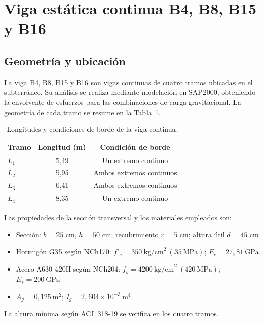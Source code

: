 \section{Viga estática continua B4, B8, B15 y B16}
\label{sec:viga-b16}
 
\subsection{Geometría y ubicación}
 
La viga B4, B8, B15 y B16 son vigas continuas de cuatro tramos ubicadas en el subterráneo. Su análisis se realiza mediante modelación en SAP2000, obteniendo la envolvente de esfuerzos para las combinaciones de carga gravitacional. La geometría de cada tramo se resume en la Tabla~\ref{tab:viga-tramos}.
 
\begin{table}[h!]
\centering
\caption{Longitudes y condiciones de borde de la viga continua.}
\label{tab:viga-tramos}
\begin{tabular}{lcc}
\toprule
Tramo & Longitud (m) & Condición de borde \\
\midrule
$L_1$ & 5{,}49 & Un extremo continuo \\
$L_2$ & 5{,}95 & Ambos extremos continuos \\
$L_3$ & 6{,}41 & Ambos extremos continuos \\
$L_4$ & 8{,}35 & Un extremo continuo \\
\bottomrule
\end{tabular}
\end{table}
 
\noindent Las propiedades de la sección transversal y los materiales empleados son:
 
\begin{itemize}
    \item Sección: $b = 25$ cm, $h = 50$ cm; recubrimiento $r = 5$ cm; altura útil $d = 45$ cm
    \item Hormigón G35 según NCh170: $f'_c = 350\ \text{kg/cm}^2\ (35\ \text{MPa})$; $E_c = 27{,}81\ \text{GPa}$
    \item Acero A630-420H según NCh204: $f_y = 4200\ \text{kg/cm}^2\ (420\ \text{MPa})$; $E_s = 200\ \text{GPa}$
    \item $A_g = 0{,}125\ \text{m}^2$; $I_g = 2{,}604 \times 10^{-3}\ \text{m}^4$
\end{itemize}
 
La altura mínima según ACI~318-19 se verifica en los cuatro tramos.
 

